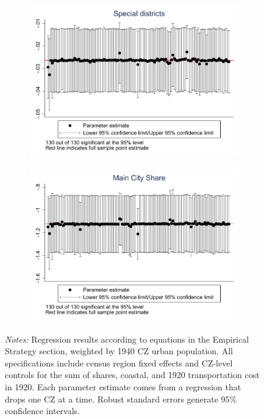 \documentclass{article}
\begin{document}
\begin{landscape}
\begin{figure}[htbp]
\begin{subfigure}{0.4\textwidth}
        \includegraphics[width=\linewidth]{figures/exogeneity_tests/loo_iv_spdist_new_ctrls.pdf}
        \label{fig:sub5}
    \end{subfigure}
    \begin{subfigure}{0.4\textwidth}
        \includegraphics[width=\linewidth]{figures/exogeneity_tests/loo_iv_totfrac_new_ctrls.pdf}
        \label{fig:sub6}
    \end{subfigure}
    \label{fig:loo_iv}
    \caption*{\scriptsize \emph{Notes:} Regression results according to equations in the Empirical Strategy section, weighted by 1940 CZ urban population. All specifications include census region fixed effects and CZ-level controls for the sum of shares, coastal, and 1920 transportation cost in 1920. Each parameter estimate comes from a regression that drops one CZ at a time. Robust standard errors generate 95\% confidence intervals.} 
\end{figure}
\clearpage

\clearpage

\clearpage

\clearpage

\clearpage

\clearpage

\clearpage

\clearpage
\end{landscape}
\end{document}
